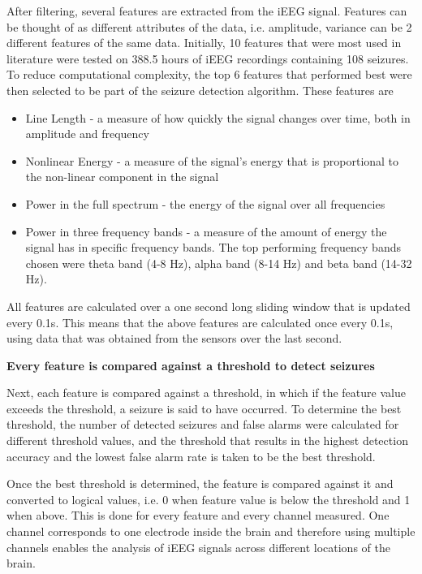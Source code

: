 \documentclass[usletter, 11pt]{extarticle}
\begin{document}
After filtering, several features are extracted from the iEEG signal. Features can be thought of as different attributes of the data, i.e. amplitude, variance can be 2 different features of the same data.  Initially, 10 features that were most used in literature were tested on 388.5 hours of iEEG recordings containing 108 seizures. To reduce computational complexity, the top 6 features that performed best were then selected to be part of the seizure detection algorithm. These features are
\begin{itemize}
	\item Line Length - a measure of how quickly the signal changes over time, both in amplitude and frequency
	\item Nonlinear Energy - a measure of the signal’s energy that is proportional to the non-linear component in the signal
	\item Power in the full spectrum - the energy of the signal over all frequencies 
	\item Power in three frequency bands - a measure of the amount of energy the signal has in specific frequency bands. The top performing frequency bands chosen were theta band (4-8 Hz), alpha band (8-14 Hz) and beta band (14-32 Hz).
\end{itemize}
All features are calculated over a one second long sliding window that is updated every 0.1s. This means that the above features are calculated once every 0.1s, using data that was obtained from the sensors over the last second.

\vspace{11pt}
\textbf{Every feature is compared against a threshold to detect seizures}

Next, each feature is compared against a threshold, in which if the feature value exceeds the threshold, a seizure is said to have occurred. To determine the best threshold, the number of detected seizures and false alarms were calculated for different threshold values, and the threshold that results in the highest detection accuracy and the lowest false alarm rate is taken to be the best threshold.

Once the best threshold is determined, the feature is compared against it and converted to logical values, i.e. 0 when feature value is below the threshold and 1 when above. This is done for every feature and every channel measured. One channel corresponds to one electrode inside the brain and therefore using multiple channels enables the analysis of iEEG signals across different locations of the brain. 
\end{document}
